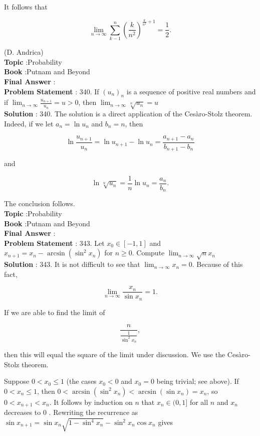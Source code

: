 \documentclass[10pt]{article}
\begin{document}
It follows that

$$
\lim _{n \rightarrow \infty} \sum_{k-1}^{n}\left(\frac{k}{n^{2}}\right)^{\frac{k}{n^{2}}+1}=\frac{1}{2} .
$$

(D. Andrica)
\\
\textbf{Topic} :Probability\\
\textbf{Book} :Putnam and Beyond\\
\textbf{Final Answer} :\\


\textbf{Problem Statement} :
340. If $\left(u_{n}\right)_{n}$ is a sequence of positive real numbers and if $\lim _{n \rightarrow \infty} \frac{u_{n+1}}{u_{n}}=u>0$, then $\lim _{n \rightarrow \infty} \sqrt[n]{u_{n}}=u$
\\
\textbf{Solution} :
340. The solution is a direct application of the Cesàro-Stolz theorem. Indeed, if we let $a_{n}=\ln u_{n}$ and $b_{n}=n$, then

$$
\ln \frac{u_{n+1}}{u_{n}}=\ln u_{n+1}-\ln u_{n}=\frac{a_{n+1}-a_{n}}{b_{n+1}-b_{n}}
$$

and

$$
\ln \sqrt[n]{u_{n}}=\frac{1}{n} \ln u_{n}=\frac{a_{n}}{b_{n}} .
$$

The conclusion follows.
\\
\textbf{Topic} :Probability\\
\textbf{Book} :Putnam and Beyond\\
\textbf{Final Answer} :\\


\textbf{Problem Statement} :
343. Let $x_{0} \in[-1,1]$ and $x_{n+1}=x_{n}-\arcsin \left(\sin ^{2} x_{n}\right)$ for $n \geq 0$. Compute $\lim _{n \rightarrow \infty} \sqrt{n} x_{n}$
\\
\textbf{Solution} :
343. It is not difficult to see that $\lim _{n \rightarrow \infty} x_{n}=0$. Because of this fact,

$$
\lim _{n \rightarrow \infty} \frac{x_{n}}{\sin x_{n}}=1 .
$$

If we are able to find the limit of

$$
\frac{n}{\frac{1}{\sin ^{2} x_{n}}},
$$

then this will equal the square of the limit under discussion. We use the Cesàro-Stolz theorem.

Suppose $0<x_{0} \leq 1$ (the cases $x_{0}<0$ and $x_{0}=0$ being trivial; see above). If $0<x_{n} \leq 1$, then $0<\arcsin \left(\sin ^{2} x_{n}\right)<\arcsin \left(\sin x_{n}\right)=x_{n}$, so $0<x_{n+1}<x_{n}$. It follows by induction on $n$ that $x_{n} \in(0,1]$ for all $n$ and $x_{n}$ decreases to 0 . Rewriting the recurrence as $\sin x_{n+1}=\sin x_{n} \sqrt{1-\sin ^{4} x_{n}}-\sin ^{2} x_{n} \cos x_{n}$ gives
\end{document}
